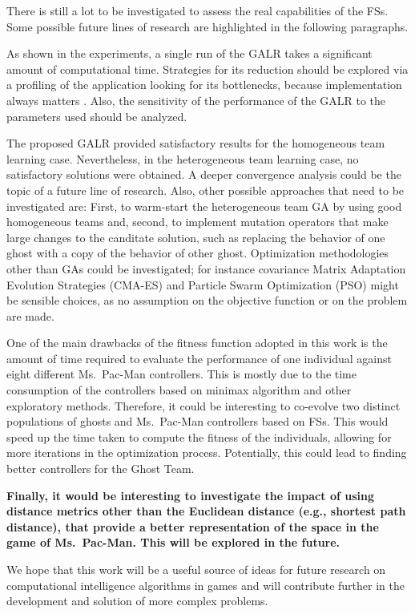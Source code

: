 \documentclass[journal]{IEEEtran}
\begin{document}
There is still a lot to be investigated to assess the real
capabilities of the FSs. Some possible future lines of research are
highlighted in the following paragraphs.

As shown in the experiments, a single run of the GALR takes a
significant amount of computational time. Strategies for its reduction
should be explored via a profiling of the application looking for its
bottlenecks, because implementation always matters
\cite{DBLP:conf/iwann/MereloRACML11}. Also, the sensitivity of the
performance of the GALR to the parameters used should be analyzed. 

The proposed GALR provided satisfactory results for the homogeneous
team learning case. Nevertheless, in the heterogeneous team learning
case, no satisfactory solutions were obtained. A deeper convergence
analysis could be the topic of a future line of research. Also, other
possible approaches that need to be investigated are: First, to
warm-start the heterogeneous team GA by using good homogeneous teams
and, second, to implement mutation operators that make large changes
to the canditate solution, such as replacing the behavior of one ghost
with a copy of the behavior of other ghost. Optimization
methodologies other than GAs could be investigated; for instance
covariance Matrix Adaptation Evolution Strategies (CMA-ES) and
Particle Swarm Optimization (PSO) might be sensible choices, as no
assumption on the objective function or on the problem are made. 

One of the main drawbacks of the fitness function adopted in this work is the amount of time required to evaluate the performance of one individual against eight different Ms.\  Pac-Man controllers. This is mostly due to the time consumption of the controllers based on minimax algorithm and other exploratory methods. Therefore, it could be interesting to co-evolve two distinct populations of ghosts and Ms.\  Pac-Man controllers based on FSs. This would speed up the time taken to compute the fitness of the individuals, allowing for more iterations in the optimization process. Potentially, this could lead to finding better controllers for the Ghost Team.

\textbf{Finally, it would be interesting to investigate the impact of using distance metrics other than the Euclidean distance (e.g., shortest path distance), that provide a better representation of the space in the game of Ms.\ Pac-Man. This will be explored in the future.}

We hope that this work will be a useful source of ideas for future research on computational intelligence algorithms in games and will contribute further in the development and solution of more complex problems.
\end{document}
